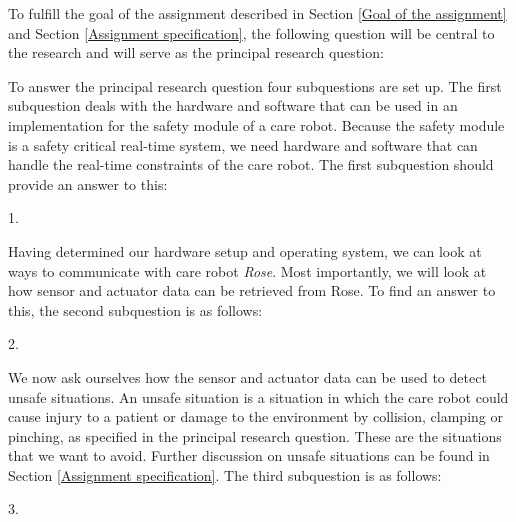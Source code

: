 \documentclass[12pt]{scrreprt}
\begin{document}
To fulfill the goal of the assignment described in Section \ref{Goal of the assignment} and Section \ref{Assignment specification}, the following question will be central to the research and will serve as the principal research question:

\begin{flushleft}
\textit{\mq}
\end{flushleft}

To answer the principal research question four subquestions are set up. The first subquestion deals with the hardware and software that can be used in an implementation for the safety module of a care robot. Because the safety module is a safety critical real-time system, we need hardware and software that can handle the real-time constraints of the care robot. The first subquestion should provide an answer to this:

\begin{flushleft}
1. \textit{\sqone}
\end{flushleft}

%

Having determined our hardware setup and operating system, we can look at ways to communicate with care robot \textit{Rose}. Most importantly, we will look at how sensor and actuator data can be retrieved from Rose. To find an answer to this, the second subquestion is as follows:

\begin{flushleft}
2. \textit{\sqtwo}
\end{flushleft}

We now ask ourselves how the sensor and actuator data can be used to detect unsafe situations. An unsafe situation is a situation in which the care robot could cause injury to a patient or damage to the environment by collision, clamping or pinching, as specified in the principal research question. These are the situations that we want to avoid. Further discussion on unsafe situations can be found in Section \ref{Assignment specification}. The third subquestion is as follows:

\begin{flushleft}
3. \textit{\sqthree}
\end{flushleft}
\end{document}
